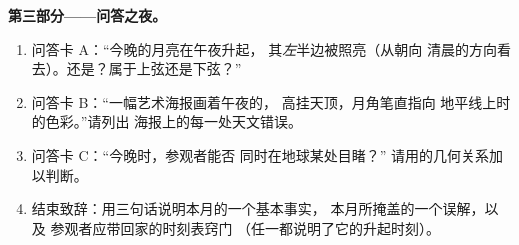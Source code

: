 \begin{problem}
\medskip\noindent\textbf{第三部分——问答之夜。}
\begin{enumerate}[resume]
  \item 问答卡 A：“今晚的月亮在午夜升起，
        其\emph{左}半边被照亮（从朝向
        清晨的方向看去）。还是？属于上弦还是下弦？”
  \item 问答卡 B：“一幅艺术海报画着午夜的，
        高挂天顶，月角笔直指向
        地平线上时的色彩。”请列出
        海报上的每一处天文错误。
  \item 问答卡 C：“今晚时，参观者能否
        同时在地球某处目睹？”
        请用的几何关系加以判断。
  \item 结束致辞：用三句话说明本月的一个基本事实，
        本月所掩盖的一个误解，以及
        参观者应带回家的时刻表窍门
        （任一都说明了它的升起时刻）。
\end{enumerate}
\end{problem}
